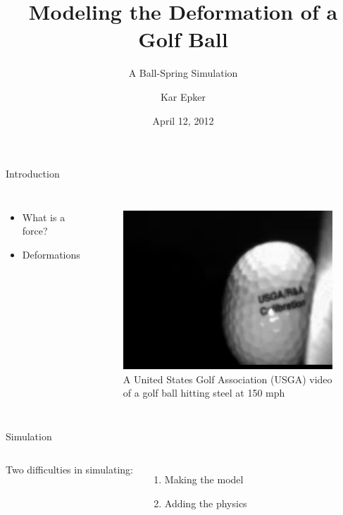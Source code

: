 \documentclass{beamer}
\begin{document}
\title{Modeling the Deformation of a Golf Ball}
\subtitle{A Ball-Spring Simulation}
\author[Kar]{Kar Epker}
\date{April 12, 2012}

{
\begin{frame}
\titlepage
\end{frame}
}
\addtocounter{framenumber}{2}

\begin{frame}{Introduction}

\begin{columns}

\begin{itemize}
\item What is a force?
\item Deformations
\end{itemize}

\begin{figure}
\includegraphics[width = 1.0\textwidth]{real_compression.png} \\
\scriptsize A United States Golf Association (USGA) video of a golf ball hitting steel at 150 mph
\end{figure}

\end{columns}
\end{frame}

\begin{frame}{Simulation}
\begin{columns}

Two dif\mbox{f}iculties in simulating:
\begin{enumerate}[1.]
\item Making the model
\item Adding the physics
\end{enumerate}

\end{columns}
\end{frame}
\end{document}
